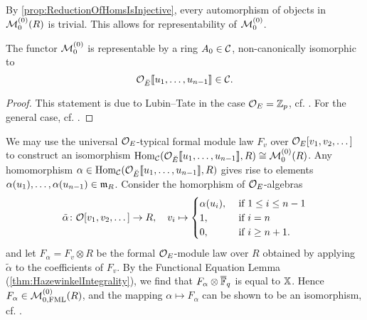 \documentclass[../main.tex]{subfiles}
\begin{document}
By \cref{prop:ReductionOfHomsIsInjective}, every automorphism of objects in
$\mathcal{M}_{0}^{(0)}(R)$ is trivial. This allows for representability of $\mathcal{M}_{0}^{(0)}$.

\begin{thm}[Representability of $\cM^{(0)}_0$]\label{thm:RepresentabilityOfDefSpaceWOLevel}
  The functor $\mathcal{M}_0^{(0)}$ is representable by a ring $A_0 \in \mathcal{C}$, non-canonically 
  isomorphic to
  \begin{equation*}
    \mathcal{O}_{\breve {E}}\llbracket u_1, \dots, u_{n-1} \rrbracket \in \mathcal{C}.
  \end{equation*}
\begin{proof}
  This statement is due to Lubin--Tate in the case $\mathcal{O}_E = \mathbb{Z}_p$, cf.
  \cite{LubinTate1966FormalModuli}. For the general case, cf. 
  \cite[Proposition 4.2]{drinfel1974elliptic}.
  \end{proof}
\end{thm}

We may use the universal $\mathcal{O}_E$-typical formal module law
$F_v$ over $\mathcal{O}_E[ v_1, v_2, \dots ]$ to construct an
isomorphism $\operatorname{Hom}_{\mathcal{C}}(\mathcal{O}_{\breve {E}}\llbracket u_1, \dots, u_{n-1} \rrbracket, R) \cong
\mathcal{M}_0^{(0)}(R)$. Any homomorphism $\alpha \in \operatorname{Hom}_{\mathcal{C}}(\mathcal{O}_{\breve {E}}\llbracket u_1,
\dots, u_{n-1} \rrbracket, R)$ gives rise to elements 
$\alpha(u_1), \dots, \alpha(u_{n-1}) \in \mathfrak{m}_R$.
Consider the homorphism of $\mathcal{O}_E$-algebras
\begin{equation*}
  \tilde \alpha\colon \mathcal{O}[v_1, v_2, \dots] \to R,
  \quad v_i \mapsto \begin{cases}
    \alpha(u_i), &\text{ if } 1 \leq i \leq n-1 \\
    1, &\text{ if } i = n \\
    0, &\text{ if } i \geq n+1.
  \end{cases}
\end{equation*}
and let $F_\alpha = F_v \otimes R$ be the formal $\mathcal{O}_E$-module law over
$R$ obtained by applying $\tilde \alpha$ to the coefficients of $F_v$. 
By the Functional Equation Lemma (\cref{thm:HazewinkelIntegrality}), we find
that $F_\alpha \otimes {\overline{\mathbb{F}}_q}$ is equal to $\mathbb{X}$. Hence 
$F_\alpha \in \mathcal{M}_{0, \text{FML}}^{(0)}(R)$, and the mapping $\alpha \mapsto F_\alpha$
can be shown to be an isomorphism, cf. \cite[Section 12]{hopkins1994equivariant}. 

\end{document}
